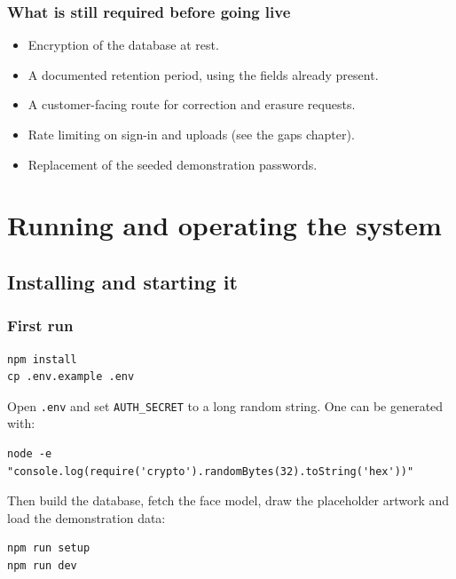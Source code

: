 \documentclass[11pt,a4paper]{report}
\newcommand{\code}[1]{\texttt{\small #1}}
\begin{document}
\section{What is still required before going live}

\begin{itemize}
  \item Encryption of the database at rest.
  \item A documented retention period, using the fields already present.
  \item A customer-facing route for correction and erasure requests.
  \item Rate limiting on sign-in and uploads (see the gaps chapter).
  \item Replacement of the seeded demonstration passwords.
\end{itemize}

\part{Running and operating the system}

\chapter{Installing and starting it}

\section{First run}

\begin{lstlisting}
npm install
cp .env.example .env
\end{lstlisting}

Open \code{.env} and set \code{AUTH\_SECRET} to a long random string. One can
be generated with:

\begin{lstlisting}
node -e "console.log(require('crypto').randomBytes(32).toString('hex'))"
\end{lstlisting}

Then build the database, fetch the face model, draw the placeholder artwork
and load the demonstration data:

\begin{lstlisting}
npm run setup
npm run dev
\end{lstlisting}
\end{document}
